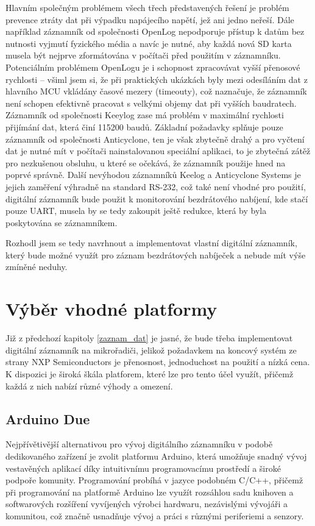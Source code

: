 Hlavním společným problémem všech třech představených řešení je problém prevence ztráty dat při výpadku napájecího napětí, jež ani jedno neřeší. Dále například záznamník od společnosti OpenLog nepodporuje přístup k datům bez nutnosti vyjmutí fyzického média a navíc je nutné, aby každá nová SD karta musela být nejprve zformátována v počítači před použitím v záznamníku. Potenciálním problémem OpenLogu je i schopnost zpracovávat vyšší přenosové rychlosti – všiml jsem si, že při praktických ukázkách byly mezi odesíláním dat z hlavního MCU vkládány časové mezery (timeouty), což naznačuje, že záznamník není schopen efektivně pracovat s velkými objemy dat při vyšších baudratech. Záznamník od společnosti Keeylog zase má problém v maximální rychlosti přijímání dat, která činí 115200 baudů. Základní požadavky splňuje pouze záznamník od společnosti Anticyclone, ten je však zbytečně drahý a pro vyčtení dat je nutné mít v počítači nainstalovanou speciální aplikaci, to je zbytečná zátěž pro nezkušenou obsluhu, u které se očekává, že záznamník použije hned na poprvé správně. Další nevýhodou záznamníků Keelog a Anticyclone Systems je jejich zaměření výhradně na standard RS-232, což také není vhodné pro použití, digitální záznamník bude použit k monitorování bezdrátového nabíjení, kde stačí pouze UART, musela by se tedy zakoupit ještě redukce, která by byla poskytována se záznamníkem.

Rozhodl jsem se tedy navrhnout a implementovat vlastní digitální záznamník, který bude možné využít pro záznam bezdrátových nabíječek a nebude mít výše zmíněné neduhy.

\section{Výběr vhodné platformy}
Již z předchozí kapitoly \ref{zaznam_dat} je jasné, že bude třeba implementovat digitální záznamník na mikrořadiči, jelikož požadavkem na koncový systém ze strany NXP Semiconductors je přenosnost, jednoduchost na použití a nízká cena. K dispozici je široká škála platforem, které lze pro tento účel využít, přičemž každá z nich nabízí různé výhody a omezení.


\subsection{Arduino Due}
Nejpřívětivější alternativou pro vývoj digitálního záznamníku v podobě dedikovaného zařízení je zvolit platformu Arduino, která umožňuje snadný vývoj vestavěných aplikací díky intuitivnímu programovacímu prostředí a široké podpoře komunity. Programování probíhá v jazyce podobném C/C++, přičemž při programování na platformě Arduino lze využít rozsáhlou sadu knihoven a softwarových rozšíření vyvíjených výrobci hardwaru, nezávislými vývojáři a komunitou, což značně usnadňuje vývoj a práci s různými periferiemi a senzory.

